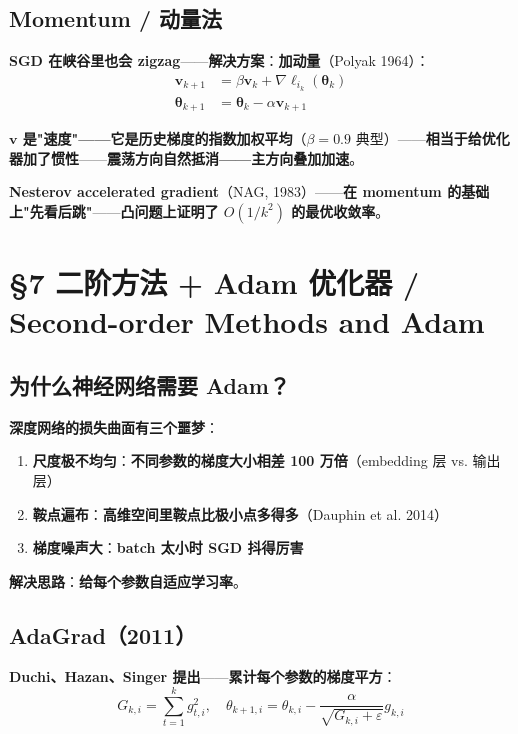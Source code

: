 \subsection{Momentum / 动量法}

\textbf{SGD 在峡谷里也会 zigzag}——\textbf{解决方案}：\textbf{加\textbf{动量}}（Polyak 1964）：
\begin{align}
\bm v_{k+1} &= \beta \bm v_k + \nabla \ell_{i_k}(\bm \theta_k) \\
\bm \theta_{k+1} &= \bm \theta_k - \alpha \bm v_{k+1}
\end{align}

\textbf{$\bm v$ 是"速度"——它是历史梯度的\textbf{指数加权平均}}（$\beta = 0.9$ 典型）——\textbf{相当于给优化器\textbf{加了惯性}}——\textbf{震荡方向自然抵消——主方向叠加加速}。

\textbf{Nesterov accelerated gradient}（NAG, 1983）——\textbf{在 momentum 的基础上"先看后跳"}——\textbf{凸问题上证明了 $O(1/k^2)$ 的最优收敛率}。

\section{§7 二阶方法 + Adam 优化器 / Second-order Methods and Adam}

\subsection{为什么神经网络需要 Adam？}

\textbf{深度网络的损失曲面有三个噩梦}：

\begin{enumerate}
\item \textbf{尺度极不均匀}：\textbf{不同参数的梯度大小相差 100 万倍}（embedding 层 vs. 输出层）
\item \textbf{鞍点遍布}：\textbf{高维空间里\textbf{鞍点比极小点多得多}}（Dauphin et al. 2014）
\item \textbf{梯度噪声大}：\textbf{batch 太小时 SGD 抖得厉害}
\end{enumerate}

\textbf{解决思路}：\textbf{给每个参数\textbf{自适应学习率}}。

\subsection{AdaGrad（2011）}

\textbf{Duchi、Hazan、Singer 提出}——\textbf{累计每个参数的梯度平方}：
\begin{equation}
G_{k,i} = \sum_{t=1}^k g_{t,i}^2, \quad \theta_{k+1, i} = \theta_{k,i} - \frac{\alpha}{\sqrt{G_{k,i} + \varepsilon}} g_{k,i}
\end{equation}

